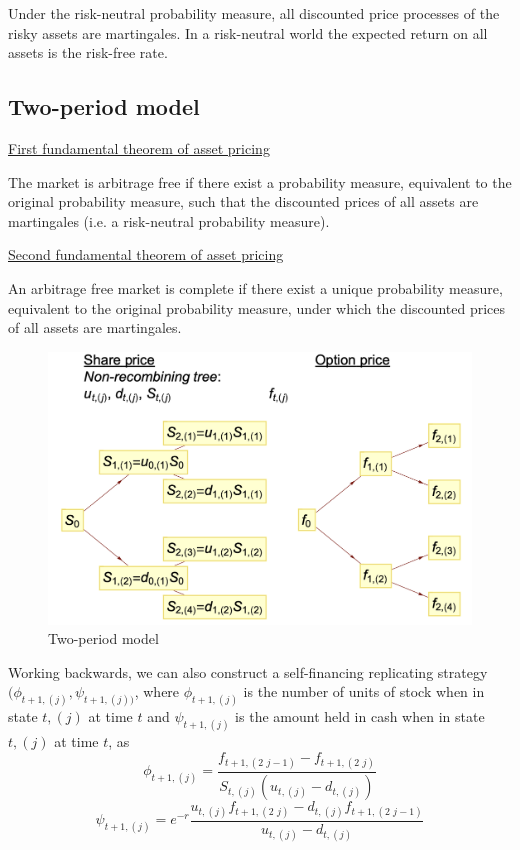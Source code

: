 \documentclass[11pt,a4paper]{book}
\theoremstyle{definition}\newtheorem{definition}{Definition}
\theoremstyle{definition}\newtheorem{fact}{Fact}
\theoremstyle{definition}\newtheorem{remark}{Remark}
\theoremstyle{definition}\newtheorem{ex}{Ex.}
\theoremstyle{definition}\newtheorem{project}{Project}
\theoremstyle{definition}\newtheorem{problem}{Problem}
\theoremstyle{definition}\newtheorem{example}{Example}
\numberwithin{theorem}{section}
\numberwithin{corollary}{chapter}
\numberwithin{assumption}{chapter}
\numberwithin{definition}{chapter}
\numberwithin{prop}{chapter}
\numberwithin{notation}{chapter}
\numberwithin{problem}{chapter}
\numberwithin{example}{chapter}
\numberwithin{fact}{chapter}
\numberwithin{ex}{chapter}
\begin{document}
Under the risk-neutral probability measure, all discounted price processes of the risky assets are martingales. In a risk-neutral world the expected return on all assets is the risk-free rate.

\subsection{Two-period model}

\underline{First fundamental theorem of asset pricing}

The market is arbitrage free if there exist a probability measure, equivalent to the original probability measure, such that the discounted prices of all assets are martingales (i.e. a risk-neutral probability measure).

\underline{Second fundamental theorem of asset pricing}

An arbitrage free market is complete if there exist a unique probability measure, equivalent to the original probability measure, under which the discounted prices of all assets are martingales.

\begin{figure}[H]
	\centering
	\includegraphics[scale=0.5]{Chapter04/Chapter4_2.png}
	\caption{Two-period model}
\end{figure}

Working backwards, we can also construct a self-financing replicating strategy $(\phi_{t+1,(j)} , \psi_{t+1,(j))}$, where $\phi_{t+1,(j)}$ is the number of units of stock when in state $t,(j)$ at time $t$ and $\psi_{t+1,(j)}$ is the amount held in cash when in state $t,(j)$ at time $t$, as
$$ \phi_{t+1,(j)} = \frac{f_{t+1,(2\,\,j-1)}-f_{t+1,(2\,\,j)}}{S_{t,(j)} (u_{t,(j)}- d_{t,(j)})} $$
$$ \psi_{t+1,(j)} = e^{-r} \frac{u_{t,(j)}f_{t+1,(2\,\,j)} - d_{t,(j)}f_{t+1,(2\,\,j-1)}}{u_{t,(j)} - d_{t,(j)}} $$
\end{document}
